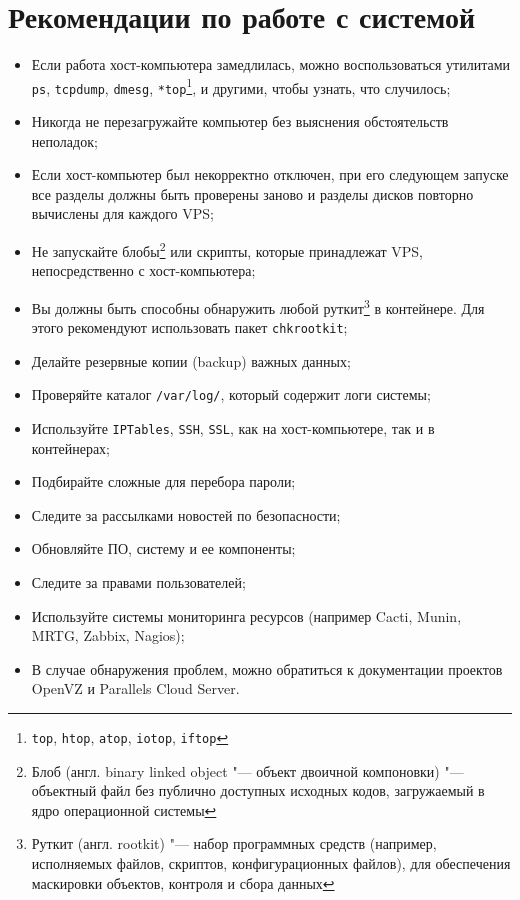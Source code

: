 \section{Рекомендации по работе с системой}
\begin{itemize}
    \item Если работа хост-компьютера замедлилась, можно воспользоваться утилитами \texttt{ps}, \texttt{tcpdump}, \texttt{dmesg}, \texttt{*top}\footnote{\texttt{top}, \texttt{htop}, \texttt{atop}, \texttt{iotop}, \texttt{iftop}}, и другими, чтобы узнать, что случилось;
    \item Никогда не перезагружайте компьютер без выяснения обстоятельств неполадок;
    \item Если хост-компьютер был некорректно отключен, при его следующем запуске все разделы должны быть проверены заново и разделы дисков повторно вычислены для каждого VPS;
    \item Не запускайте блобы\footnote{Блоб (англ. binary linked object "--- объект двоичной компоновки) "--- объектный файл без публично доступных исходных кодов, загружаемый в ядро операционной системы} или скрипты, которые принадлежат VPS, непосредственно с хост-компьютера;
    \item Вы должны быть способны обнаружить любой руткит\footnote{Руткит (англ. rootkit) "--- набор программных средств (например, исполняемых файлов, скриптов, конфигурационных файлов), для обеспечения маскировки объектов, контроля и сбора данных} в контейнере. Для этого рекомендуют использовать пакет \texttt{chkrootkit};
    \item Делайте резервные копии (backup) важных данных;
    \item Проверяйте каталог \texttt{/var/log/}, который содержит логи системы;
    \item Используйте \texttt{IPTables}, \texttt{SSH}, \texttt{SSL}, как на хост-компьютере, так и в контейнерах;
    \item Подбирайте сложные для перебора пароли;
    \item Следите за рассылками новостей по безопасности;
    \item Обновляйте ПО, систему и ее компоненты;
    \item Следите за правами пользователей;
    \item Используйте системы мониторинга ресурсов (например Cacti, Munin, MRTG, Zabbix, Nagios);
    \item В случае обнаружения проблем, можно обратиться к документации проектов OpenVZ и Parallels Cloud Server.
\end{itemize}

\clearpage

